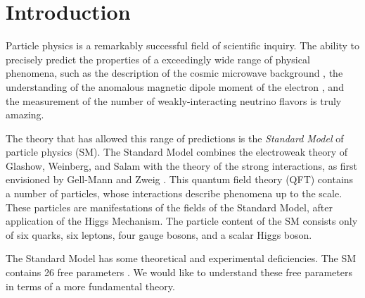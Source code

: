 
\chapter{Introduction}


Particle physics is a remarkably successful field of scientific inquiry.
The ability to precisely predict the properties of a exceedingly wide range of physical phenomena, such as the description of the cosmic microwave background \cite{Perdereau:2016akt,Aghanim:2016sns}, the understanding of the anomalous magnetic dipole moment of the electron \cite{Schwinger:1948iu, Laporta:1996mq}, and the measurement of the number of weakly-interacting neutrino flavors \cite{ALEPH:2005ab} is truly amazing.

The theory that has allowed this range of predictions is the \textit{Standard Model} of particle physics (SM).
The Standard Model combines the electroweak theory of Glashow, Weinberg, and Salam \cite{Glashow:1961tr, Weinberg:1967tq,  Salam:1968rm} with the theory of the strong interactions, as first envisioned by Gell-Mann and Zweig \cite{GellMann:1964nj, Zweig:1964jf}.
This quantum field theory (QFT) contains a number of particles, whose interactions describe phenomena up to the \TeV\xspace scale.
These particles are manifestations of the fields of the Standard Model, after application of the Higgs Mechanism.
The particle content of the SM consists only of six quarks, six leptons, four gauge bosons, and a scalar Higgs boson.

The Standard Model has some theoretical and experimental deficiencies.
The SM contains 26 free parameters \footnotemark.
We would like to understand these free parameters in terms of a more fundamental theory.

